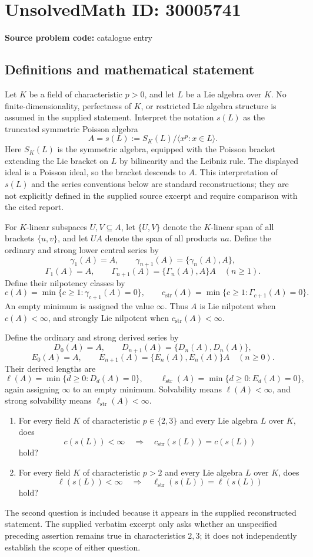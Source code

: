 \documentclass[11pt]{article}
\begin{document}
\section*{UnsolvedMath ID: 30005741}
\textbf{Source problem code:} catalogue entry
\subsection{Definitions and mathematical statement}
Let \(K\) be a field of characteristic \(p>0\), and let \(L\) be a Lie algebra over \(K\). No finite-dimensionality, perfectness of \(K\), or restricted Lie algebra structure is assumed in the supplied statement. Interpret the notation \(s(L)\) as the truncated symmetric Poisson algebra
\[
A=s(L):=S_K(L)/\langle x^p:x\in L\rangle.
\]
Here \(S_K(L)\) is the symmetric algebra, equipped with the Poisson bracket extending the Lie bracket on \(L\) by bilinearity and the Leibniz rule. The displayed ideal is a Poisson ideal, so the bracket descends to \(A\). This interpretation of \(s(L)\) and the series conventions below are standard reconstructions; they are not explicitly defined in the supplied source excerpt and require comparison with the cited report.

For \(K\)-linear subspaces \(U,V\subseteq A\), let \(\{U,V\}\) denote the \(K\)-linear span of all brackets \(\{u,v\}\), and let \(UA\) denote the span of all products \(ua\). Define the ordinary and strong lower central series by
\[
\gamma_1(A)=A,\qquad
\gamma_{n+1}(A)=\{\gamma_n(A),A\},
\]
\[
\Gamma_1(A)=A,\qquad
\Gamma_{n+1}(A)=\{\Gamma_n(A),A\}A
\quad(n\geq1).
\]
Define their nilpotency classes by
\[
c(A)=\min\{c\geq1:\gamma_{c+1}(A)=0\},\qquad
c_{\mathrm{str}}(A)=\min\{c\geq1:\Gamma_{c+1}(A)=0\}.
\]
An empty minimum is assigned the value \(\infty\). Thus \(A\) is Lie nilpotent when \(c(A)<\infty\), and strongly Lie nilpotent when \(c_{\mathrm{str}}(A)<\infty\).

Define the ordinary and strong derived series by
\[
D_0(A)=A,\qquad D_{n+1}(A)=\{D_n(A),D_n(A)\},
\]
\[
E_0(A)=A,\qquad E_{n+1}(A)=\{E_n(A),E_n(A)\}A
\quad(n\geq0).
\]
Their derived lengths are
\[
\ell(A)=\min\{d\geq0:D_d(A)=0\},\qquad
\ell_{\mathrm{str}}(A)=\min\{d\geq0:E_d(A)=0\},
\]
again assigning \(\infty\) to an empty minimum. Solvability means \(\ell(A)<\infty\), and strong solvability means \(\ell_{\mathrm{str}}(A)<\infty\).

\begin{enumerate}
\item For every field \(K\) of characteristic \(p\in\{2,3\}\) and every Lie algebra \(L\) over \(K\), does
\[
c(s(L))<\infty\quad\Longrightarrow\quad
c_{\mathrm{str}}(s(L))=c(s(L))
\]
hold?
\item For every field \(K\) of characteristic \(p>2\) and every Lie algebra \(L\) over \(K\), does
\[
\ell(s(L))<\infty\quad\Longrightarrow\quad
\ell_{\mathrm{str}}(s(L))=\ell(s(L))
\]
hold?
\end{enumerate}
The second question is included because it appears in the supplied reconstructed statement. The supplied verbatim excerpt only asks whether an unspecified preceding assertion remains true in characteristics \(2,3\); it does not independently establish the scope of either question.
\end{document}
